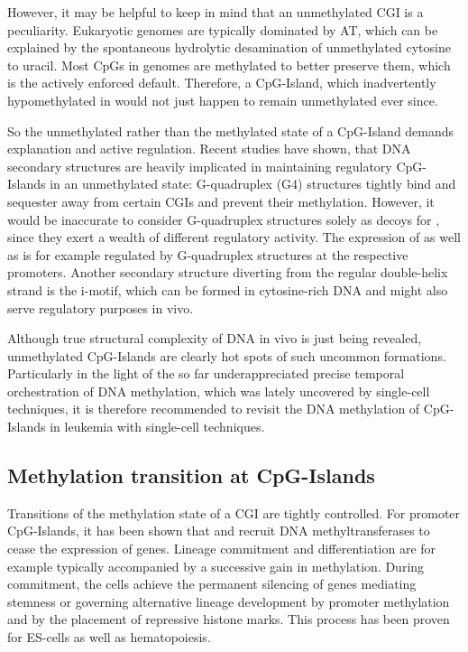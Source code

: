 However, it may be helpful to keep in mind that an unmethylated CGI is a peculiarity. Eukaryotic genomes are typically dominated by AT\cite{Chargaff1951}, which can be explained by the spontaneous hydrolytic desamination of unmethylated cytosine to uracil. Most CpGs in genomes are methylated to better preserve them\cite{Ziller2013}, which is the actively enforced default\cite{Domcke2015}. Therefore, a CpG-Island, which inadvertently hypomethylated in \dnmtchip would not just happen to remain unmethylated ever since. 

So the unmethylated rather than the methylated state of a CpG-Island demands explanation and active regulation. Recent studies have shown, that DNA secondary structures are heavily implicated in maintaining regulatory CpG-Islands in an unmethylated state: G-quadruplex (G4) structures tightly bind and sequester  away from certain CGIs and prevent their methylation\cite{Mao2018}.  However, it would be inaccurate to consider G-quadruplex structures solely as decoys for , since they exert a wealth of different regulatory activity. The expression of \cite{Panda2015} as well as \kit\cite{Phan2007} is for example regulated by G-quadruplex structures at the respective promoters. Another secondary structure diverting from the regular double-helix strand is the i-motif, which can be formed in cytosine-rich DNA and might also serve regulatory purposes in vivo\cite{Zeraati2018}.

Although true structural complexity of DNA in vivo is just being revealed, unmethylated CpG-Islands are clearly hot spots of such uncommon formations. Particularly in the light of the so far underappreciated precise temporal orchestration of DNA methylation, which was lately uncovered by single-cell techniques, it is therefore recommended to revisit the DNA methylation of CpG-Islands in \dnmtchip \mllafnine leukemia with single-cell techniques. 

\subsection{Methylation transition at CpG-Islands} 
\label{chap:d:methylation:persistentregions:cgi:transmeth}

Transitions of the methylation state of a CGI are tightly controlled. For promoter CpG-Islands, it has been shown that  and  recruit DNA methyltransferases to cease the expression of genes\cite{Vire2006}. Lineage commitment and differentiation are for example typically accompanied by a successive gain in methylation\cite{Luu2013,Rulands2018}. During commitment, the cells achieve the permanent silencing of genes mediating stemness or governing alternative lineage development by promoter methylation and by the placement of repressive histone marks. This process has been proven for ES-cells\cite{Xie2013,Lee2014} as well as hematopoiesis\cite{Cabezas-Wallscheid2014}. 

